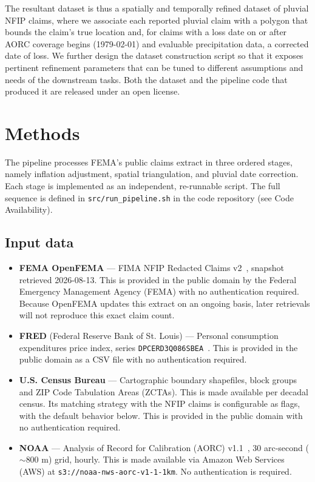 The resultant dataset is thus a spatially and temporally refined dataset of pluvial NFIP claims, where we associate each reported pluvial claim with a polygon that bounds the claim's true location and, for claims with a loss date on or after AORC coverage begins (1979-02-01) and evaluable precipitation data, a corrected date of loss.
%
We further design the dataset construction script so that it exposes pertinent refinement parameters that can be tuned to different assumptions and needs of the downstream tasks.
%
Both the dataset and the pipeline code that produced it are released under an open license.

\section*{Methods}

The pipeline processes FEMA's public claims extract in three ordered
stages, namely inflation adjustment, spatial triangulation, and pluvial
date correction. Each stage is implemented as an independent,
re-runnable script. The full sequence is defined in
\texttt{src/run\_pipeline.sh} in the code repository (see Code
Availability).

\subsection*{Input data}

\begin{itemize}
  \item \textbf{FEMA OpenFEMA} --- FIMA NFIP Redacted Claims v2~\cite{fema_nfip_claims_v2}, snapshot retrieved 2026-08-13. This is provided in the public domain by the Federal Emergency Management Agency (FEMA) with no authentication required. Because OpenFEMA updates this extract on an ongoing basis, later retrievals will not reproduce this exact claim count.
  \item \textbf{FRED} (Federal Reserve Bank of St. Louis) --- Personal
    consumption expenditures price index, series
    \texttt{DPCERD3Q086SBEA}~\cite{fred_dpcerd3q086sbea}. This is provided in the public domain as a CSV file with no authentication required.
  \item \textbf{U.S. Census Bureau} --- Cartographic boundary shapefiles, block groups and ZIP Code Tabulation Areas (ZCTAs). This is made available per decadal census. Its matching strategy with the NFIP claims is configurable as flags, with the default behavior below. This is provided in the public domain with no authentication required.
  \item \textbf{NOAA} --- Analysis of Record for Calibration (AORC) v1.1~\cite{fall_analysis_2023}, 30 arc-second ($\sim$800 m) grid, hourly. This is made available via Amazon Web Services (AWS) at \texttt{s3://noaa-nws-aorc-v1-1-1km}. No authentication is required.
\end{itemize}

